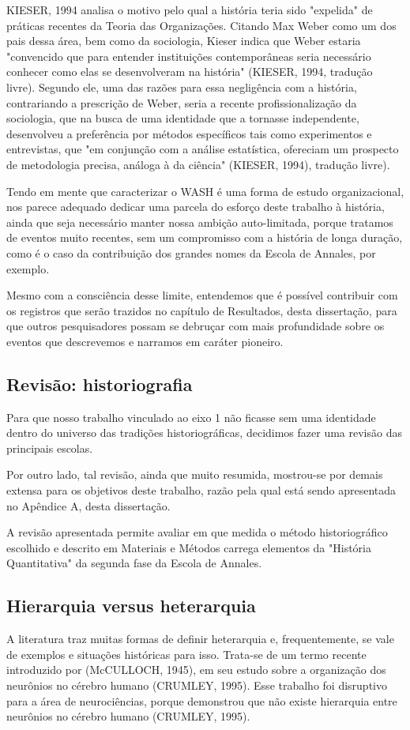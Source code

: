 KIESER, 1994  analisa o motivo pelo qual a história teria sido "expelida" de práticas recentes da Teoria das Organizações. Citando Max Weber como um dos pais dessa área, bem como da sociologia, Kieser indica que Weber estaria "convencido que para entender instituições contemporâneas seria necessário conhecer como elas se desenvolveram na história"  (KIESER, 1994, tradução livre). Segundo ele, uma das razões para essa negligência com a história, contrariando a prescrição de Weber, seria a recente profissionalização da sociologia, que na busca de uma identidade que a tornasse independente, desenvolveu a preferência por métodos específicos tais como experimentos e entrevistas, que "em conjunção com a análise estatística, ofereciam um prospecto de metodologia precisa, análoga à da ciência" (KIESER, 1994), tradução livre).

Tendo em mente que caracterizar o WASH é uma forma de estudo organizacional, nos parece adequado dedicar uma parcela do esforço deste trabalho à história, ainda que seja necessário manter nossa ambição auto-limitada, porque tratamos de eventos muito recentes, sem um compromisso com a história de longa duração, como é o caso da contribuição dos grandes nomes da Escola de Annales, por exemplo.

Mesmo com a consciência desse limite, entendemos que é possível contribuir com os registros que serão trazidos no capítulo de Resultados, desta dissertação, para que outros pesquisadores possam se debruçar com mais profundidade sobre os eventos que descrevemos e narramos em caráter pioneiro.

\subsection[Revisão: historiografia]{Revisão: historiografia}\label{Revisão: historiografia}
Para que nosso trabalho vinculado ao eixo 1 não ficasse sem uma identidade dentro do universo das tradições historiográficas, decidimos fazer uma revisão das principais escolas.

Por outro lado, tal revisão, ainda que muito resumida, mostrou-se por demais extensa para os objetivos deste trabalho, razão pela qual está sendo apresentada no Apêndice A, desta dissertação.

A revisão apresentada permite avaliar em que medida o método historiográfico escolhido e descrito em Materiais e Métodos carrega elementos da "História Quantitativa" da segunda fase da Escola de Annales.

\subsection[Hierarquia versus heterarquia]{Hierarquia versus heterarquia}\label{Hierarquia versus heterarquia}
A literatura traz muitas formas de definir heterarquia e, frequentemente, se vale de exemplos e situações históricas para isso. Trata-se de um termo  recente introduzido  por (McCULLOCH, 1945), em seu estudo sobre a organização dos neurônios no cérebro humano (CRUMLEY, 1995). Esse trabalho foi disruptivo para a área de neurociências, porque demonstrou que não existe hierarquia entre neurônios no cérebro humano  (CRUMLEY, 1995).

